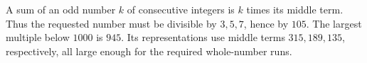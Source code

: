 A sum of an odd number $k$ of consecutive integers is $k$ times its middle term. Thus the requested number must be divisible by $3,5,7$, hence by $105$. The largest multiple below $1000$ is $\boxed{945}$. Its representations use middle terms $315,189,135$, respectively, all large enough for the required whole-number runs.
